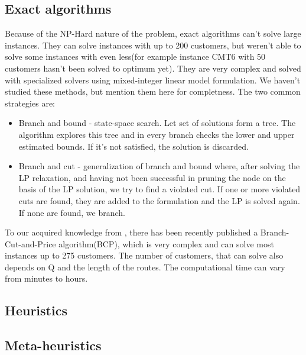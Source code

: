 \documentclass[thesis=B,english]{FITthesis}[2012/10/20]
\begin{document}
        \subsection{Exact algorithms}
            Because of the NP-Hard nature of the problem, exact algorithms can't solve large instances. They can solve instances with up to 200 customers, but weren't able to solve some instances with even less(for example instance CMT6 with 50 customers hasn't been solved to optimum yet).
            They are very complex and solved with specialized solvers using mixed-integer linear model formulation. We haven't studied these methods, but mention them here for completness.
            The two common strategies are:
            \begin{itemize}
              \item Branch and bound - state-space search. Let set of solutions form a tree. The algorithm explores this tree and in every branch checks the lower and upper estimated bounds. If it's not satisfied, the solution is discarded.
              \item Branch and cut - generalization of branch and bound where, after solving the LP relaxation, and having not been successful in pruning the node on the basis of the LP solution, we try to find a violated cut. If one or more violated cuts are found, they are added to the formulation and the LP is solved again. If none are found, we branch.
            \end{itemize}
            To our acquired knowledge from \cite{3}, there has been recently published a Branch-Cut-and-Price algorithm(BCP)\cite{2}, which is very complex and can solve most instances up to 275 customers. The number of customers, that can solve also depends on Q and the length of the routes. The computational time can vary from minutes to hours.

        \subsection{Heuristics}

        \subsection{Meta-heuristics}
\end{document}
